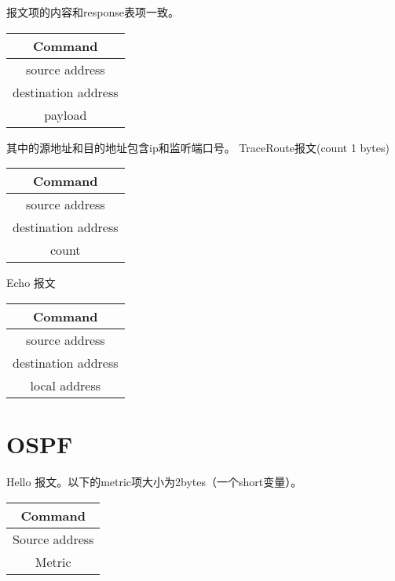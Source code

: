 \documentclass[15pt]{ctexart}
\begin{document}
报文项的内容和response表项一致。
\begin{table}[H]
	\centering
	\begin{tabular}{|c|}
		\hline
		Command \\
		\hline
		source address \\
		\hline
		destination address \\
		\hline
		payload \\
		\hline
	\end{tabular}		
\end{table}
其中的源地址和目的地址包含ip和监听端口号。
TraceRoute报文(count 1 bytes)
	\begin{table}[H]
	\centering
		\begin{tabular}{|c|}
			\hline
			Command \\
			\hline
			source address \\
			\hline
			destination address \\
			\hline
			count \\
			\hline
		\end{tabular}		
	\end{table}	

Echo 报文
	\begin{table}[H]
	\centering
		\begin{tabular}{|c|}
			\hline
			Command \\
			\hline
			source address \\
			\hline
			destination address \\
			\hline
			local address \\
			\hline
		\end{tabular}		
	\end{table}


\section{OSPF} %
\label{sec:ospf}
	Hello 报文。以下的metric项大小为2bytes（一个short变量）。
	\begin{table}[H]
	\centering
		\begin{tabular}{|c|}
			\hline
			Command \\
			\hline
			Source address \\
			\hline
			Metric \\
			\hline
		\end{tabular}		
	\end{table}
	
\end{document}
